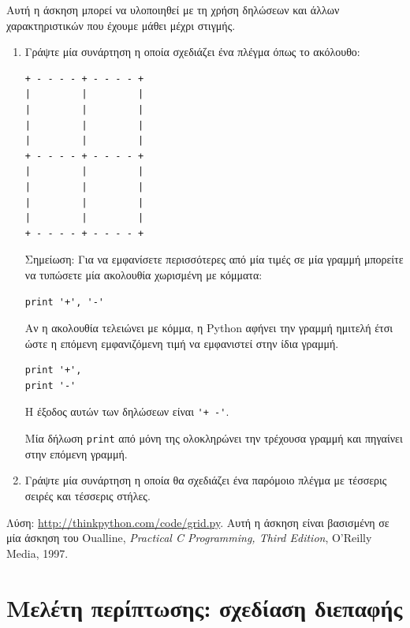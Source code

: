 \documentclass[10pt]{book}
\begin{document}
\begin{exercise}

Αυτή η άσκηση μπορεί να υλοποιηθεί με τη χρήση δηλώσεων και άλλων
χαρακτηριστικών που έχουμε μάθει μέχρι στιγμής.


\begin{enumerate}

\item Γράψτε μία συνάρτηση η οποία σχεδιάζει ένα πλέγμα όπως το ακόλουθο:


\begin{verbatim}
+ - - - - + - - - - +
|         |         |
|         |         |
|         |         |
|         |         |
+ - - - - + - - - - +
|         |         |
|         |         |
|         |         |
|         |         |
+ - - - - + - - - - +
\end{verbatim}
%

Σημείωση: Για να εμφανίσετε περισσότερες από μία τιμές σε μία γραμμή μπορείτε να τυπώσετε μία ακολουθία χωρισμένη με κόμματα:


\begin{verbatim}
print '+', '-'
\end{verbatim}
%

Αν η ακολουθία τελειώνει με κόμμα, η Python αφήνει την γραμμή ημιτελή 
έτσι ώστε η επόμενη εμφανιζόμενη τιμή να εμφανιστεί στην ίδια γραμμή.


\begin{verbatim}
print '+',
print '-'
\end{verbatim}
%

Η έξοδος αυτών των δηλώσεων είναι \verb"'+ -'". 

Μία δήλωση {\tt print} από μόνη της ολοκληρώνει την τρέχουσα γραμμή
και πηγαίνει στην επόμενη γραμμή.

\item Γράψτε μία συνάρτηση η οποία θα σχεδιάζει ένα παρόμοιο πλέγμα
με τέσσερις σειρές και τέσσερις στήλες.


\end{enumerate}

Λύση: \url{http://thinkpython.com/code/grid.py}.
Αυτή η άσκηση είναι βασισμένη σε μία άσκηση του Oualline,
{\em Practical C Programming, Third Edition}, O'Reilly Media, 1997.

\end{exercise}





\chapter{Μελέτη περίπτωσης: σχεδίαση διεπαφής}
\label{turtlechap}
\end{document}
